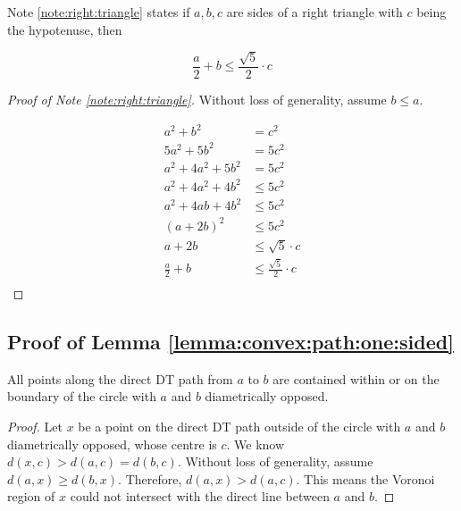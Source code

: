 \documentclass{tufte-handout}
\begin{document}
Note \ref{note:right:triangle} states if $a,b,c$ are sides of a right
triangle with $c$ being the hypotenuse, then

\begin{displaymath}
  \frac{a}{2} + b \le \frac{\sqrt{5}}{2} \cdot c
\end{displaymath}

\begin{proof}[Proof of Note \ref{note:right:triangle}]
  Without loss of generality, assume $b \le a$.
  
  \begin{align*}
    a^2 + b^2 &= c^2 \\
    5a^2 + 5b^2 &= 5c^2 \\
    a^2 + 4a^2 + 5b^2 &= 5c^2 \\
    a^2 + 4a^2 + 4b^2 &\le 5c^2 \\
    a^2 + 4ab + 4b^2 &\le 5c^2 \\
    (a + 2b)^2 &\le 5c^2 \\
    a + 2b &\le \sqrt{5} \cdot c \\
    \frac{a}{2} + b &\le \frac{\sqrt{5}}{2} \cdot c \\
  \end{align*}
\end{proof}

\subsection{Proof of Lemma \ref{lemma:convex:path:one:sided}}

\begin{Lemma}[2]

  \label{lemma:circle:contains:path}

  All points along the direct DT path from $a$ to $b$ are contained
  within or on the boundary of the circle with $a$ and $b$
  diametrically opposed.  \footnotemark
  
\end{Lemma}

  
\begin{proof}
  
  Let $x$ be a point on the direct DT path outside of the circle
  with $a$ and $b$ diametrically opposed, whose centre is $c$.  We
  know $d(x,c) > d(a,c) = d(b,c)$.  Without loss of generality,
  assume $d(a,x) \ge d(b,x)$.  Therefore, $d(a,x) > d(a,c)$.  This
  means the Voronoi region of $x$ could not intersect with the
  direct line between $a$ and $b$.
  
\end{proof}
\end{document}

